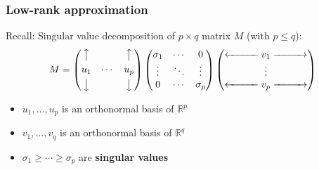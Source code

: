 \documentclass[smaller,handout]{beamer}
\def\R{{\mathbb R}}
\def\darkgreen{\color{green!60!black}}
\def\R{{\mathbb R}}
\begin{document}
\begin{frame}
\frametitle{Low-rank approximation}

Recall: Singular value decomposition of $p \times q$ matrix $M$ (with $p \leq q$): 
$$
M = 
\begin{pmatrix}
\big\uparrow    &         & \big\uparrow \\[.05in]
u_1             &  \cdots & u_p  \\[.05in]
\big\downarrow  &         & \big\downarrow
\end{pmatrix}
\begin{pmatrix}
\sigma_1  & \cdots & 0       \\
\vdots    & \ddots & \vdots  \\
0         & \cdots & \sigma_p            
\end{pmatrix}
\begin{pmatrix} 
\xleftarrow{\hspace*{1cm}} v_1 \xrightarrow{\hspace*{1cm}} \\
\vdots \\
\xleftarrow{\hspace*{1cm}} v_p \xrightarrow{\hspace*{1cm}} 
\end{pmatrix}
$$
\begin{itemize}
\item {\darkgreen $u_1, \ldots, u_p$ is an orthonormal basis of $\R^p$}
\item {\darkgreen $v_1, \ldots, v_q$ is an orthonormal basis of $\R^q$}
\item {\darkgreen $\sigma_1 \geq \cdots \geq \sigma_p$ are {\bf singular values}}
\end{itemize}


\end{frame}
\end{document}
